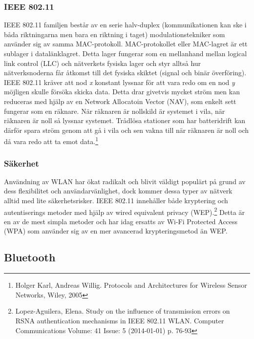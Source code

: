 \documentclass[a4paper,12pt,fleqn]{article}
\begin{document}
\subsubsection{IEEE 802.11}
IEEE 802.11 familjen består av en serie halv-duplex (kommunikationen kan ske i båda riktningarna men bara en riktning i taget) modulationstekniker som använder sig av samma MAC-protokoll. MAC-protokollet eller MAC-lagret är ett sublager i datalänklagret. Detta lager fungerar som en mellanhand mellan logical link control (LLC) och nätverkets fysiska lager och styr alltså hur nätverksnoderna får åtkomst till det fysiska skiktet (signal och binär överföring).
IEEE 802.11 kräver att nod \emph{x} konstant lyssnar för att vara redo om en nod \emph{y} möjligen skulle försöka skicka data. Detta drar givetvis mycket ström men kan reduceras med hjälp av en Network Allocatoin Vector (NAV), som enkelt sett fungerar som en räknare. När räknaren är nollskild är systemet i vila, när räknaren är noll så lyssnar systemet. Trådlösa stationer som har batteridrift kan därför spara ström genom att gå i vila och sen vakna till när räknaren är noll och då vara redo att ta emot data.\footnote{Holger Karl, Andreas Willig. Protocols and Architectures for Wireless Sensor Networks, Wiley, 2005}

\subsubsection{Säkerhet}
Användning av WLAN har ökat radikalt och blivit väldigt populärt på grund av dess flexibilitet och användarvänlighet, dock kommer dessa typer av nätverk alltid med lite säkerhetsrisker. IEEE 802.11 innehåller både kryptering och autentiserings metoder med hjälp av wired equivalent privacy (WEP).\footnote{Lopez-Aguilera, Elena. Study on the influence of transmission errors on RSNA authentication mechanisms in IEEE 802.11 WLAN. Computer Communications Volume: 41 Issue: 5 (2014-01-01) p. 76-93} Detta är en av de mest simpla metoder och har idag ersatts av  Wi-Fi Protected Access (WPA) som använder sig av en mer avancerad krypteringsmetod än WEP. 

\subsection{Bluetooth}
\end{document}
